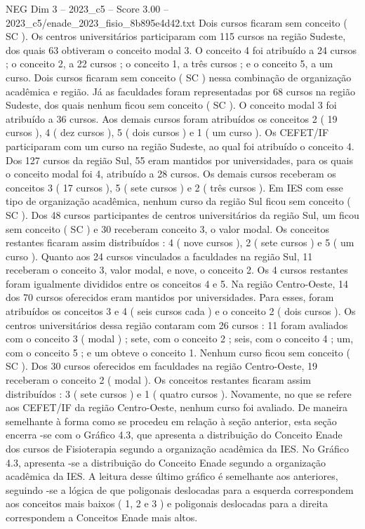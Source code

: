 \begin{textsample}{NEG Dim 3 – 2023\_c5 – Score 3.00 – 2023\_c5/enade\_2023\_fisio\_8b895e4d42.txt}
Dois cursos ficaram sem conceito ( SC ).
Os centros universitários participaram com 115 cursos na região Sudeste, dos quais 63 obtiveram o conceito modal 3.
O conceito 4 foi atribuído a 24 cursos ; o conceito 2, a 22 cursos ; o conceito 1, a três cursos ; e o conceito 5, a um curso.
Dois cursos ficaram sem conceito ( SC ) nessa combinação de organização acadêmica e região.
Já as faculdades foram representadas por 68 cursos na região Sudeste, dos quais nenhum ficou sem conceito ( SC ).
O conceito modal 3 foi atribuído a 36 cursos.
Aos demais cursos foram atribuídos os conceitos 2 ( 19 cursos ), 4 ( dez cursos ), 5 ( dois cursos ) e 1 ( um curso ).
Os CEFET/IF participaram com um curso na região Sudeste, ao qual foi atribuído o conceito 4.
Dos 127 cursos da região Sul, 55 eram mantidos por universidades, para os quais o conceito modal foi 4, atribuído a 28 cursos.
Os demais cursos receberam os conceitos 3 ( 17 cursos ), 5 ( sete cursos ) e 2 ( três cursos ).
Em IES com esse tipo de organização acadêmica, nenhum curso da região Sul ficou sem conceito ( SC ).
Dos 48 cursos participantes de centros universitários da região Sul, um ficou sem conceito ( SC ) e 30 receberam conceito 3, o valor modal.
Os conceitos restantes ficaram assim distribuídos : 4 ( nove cursos ), 2 ( sete cursos ) e 5 ( um curso ).
Quanto aos 24 cursos vinculados a faculdades na região Sul, 11 receberam o conceito 3, valor modal, e nove, o conceito 2.
Os 4 cursos restantes foram igualmente divididos entre os conceitos 4 e 5.
Na região Centro-Oeste, 14 dos 70 cursos oferecidos eram mantidos por universidades.
Para esses, foram atribuídos os conceitos 3 e 4 ( seis cursos cada ) e o conceito 2 ( dois cursos ).
Os centros universitários dessa região contaram com 26 cursos : 11 foram avaliados com o conceito 3 ( modal ) ; sete, com o conceito 2 ; seis, com o conceito 4 ; um, com o conceito 5 ; e um obteve o conceito 1.
Nenhum curso ficou sem conceito ( SC ).
Dos 30 cursos oferecidos em faculdades na região Centro-Oeste, 19 receberam o conceito 2 ( modal ).
Os conceitos restantes ficaram assim distribuídos : 3 ( sete cursos ) e 1 ( quatro cursos ).
Novamente, no que se refere aos CEFET/IF da região Centro-Oeste, nenhum curso foi avaliado.
De maneira semelhante à forma como se procedeu em relação à seção anterior, esta seção encerra -se com o Gráfico 4.3, que apresenta a distribuição do Conceito Enade dos cursos de Fisioterapia segundo a organização acadêmica da IES.
No Gráfico 4.3, apresenta -se a distribuição do Conceito Enade segundo a organização acadêmica da IES.
A leitura desse último gráfico é semelhante aos anteriores, seguindo -se a lógica de que poligonais deslocadas para a esquerda correspondem aos conceitos mais baixos ( 1, 2 e 3 ) e poligonais deslocadas para a direita correspondem a Conceitos Enade mais altos.

\end{textsample}
